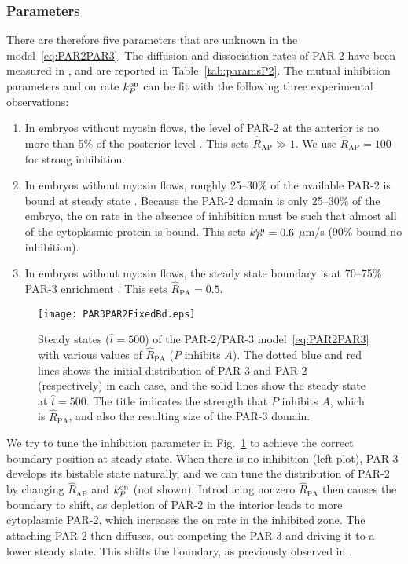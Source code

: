 \documentclass[11pt]{article}
\newcommand{\6}[1]{#1_{\text{6}}}
\newcommand{\3}[1]{#1_{\text{3}}}
\begin{document}
\subsubsection{Parameters \label{sec:param23}}
There are therefore five parameters that are unknown in the model\ \eqref{eq:PAR2PAR3}. The diffusion and dissociation rates of PAR-2 have been measured in \cite{goehring2011polarization}, and are reported in Table\ \ref{tab:paramsP2}. The mutual inhibition parameters and on rate $k^\text{on}_P$ can be fit with the following three experimental observations:
\begin{enumerate}
\item In embryos without myosin flows, the level of PAR-2 at the anterior is no more than 5\% of the posterior level \cite[Fig.~2c]{gross2019guiding}. This sets $\hat R_\text{AP} \gg 1$. We use $\hat R_\text{AP}=100$ for strong inhibition.
\item In embryos without myosin flows, roughly 25--30\% of the available PAR-2 is bound at steady state \cite[Fig.~S3]{gross2019guiding}. Because the PAR-2 domain is only 25--30\% of the embryo, the on rate in the absence of inhibition must be such that almost all of the cytoplasmic protein is bound. This sets $k^\text{on}_P=0.6$ $\mu$m/s (90\% bound no inhibition).
\item In embryos without myosin flows, the steady state boundary is at 70--75\% PAR-3 enrichment \cite[Fig.~5B]{zonies2010symmetry}. This sets $\hat{R}_\text{PA}=0.5$.
\end{enumerate}


\begin{figure}
\centering
\texttt{[image: PAR3PAR2FixedBd.eps]}
\caption{\label{fig:P32FixBd}Steady states ($\hat t=500$) of the PAR-2/PAR-3 model\ \eqref{eq:PAR2PAR3} with various values of $\hat R_\text{PA}$ ($P$ inhibits $A$). The dotted blue and red lines shows the initial distribution of PAR-3 and PAR-2 (respectively) in each case, and the solid lines show the steady state at $\hat t = 500$. The title indicates the strength that $P$ inhibits $A$, which is $\hat R_\text{PA}$, and also the resulting size of the PAR-3 domain.}
\end{figure}

We try to tune the inhibition parameter in Fig.\ \ref{fig:P32FixBd} to achieve the correct boundary position at steady state. When there is no inhibition (left plot), PAR-3 develops its bistable state naturally, and we can tune the distribution of PAR-2 by changing $\hat R_\text{AP}$ and $k^\text{on}_P$ (not shown). Introducing nonzero $\hat R_\text{PA}$ then causes the boundary to shift, as depletion of PAR-2 in the interior leads to more cytoplasmic PAR-2, which increases the on rate in the inhibited zone. The attaching PAR-2 then diffuses, out-competing the PAR-3 and driving it to a lower steady state. This shifts the boundary, as previously observed in \cite{goehring2011polarization}. 
\end{document}
